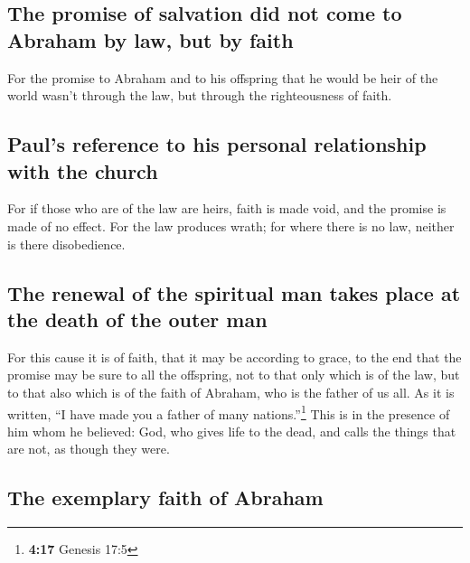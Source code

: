 \hypertarget{the-promise-of-salvation-did-not-come-to-abraham-by-law-but-by-faith}{%
\subsection{The promise of salvation did not come to Abraham by law, but
by
faith}\label{the-promise-of-salvation-did-not-come-to-abraham-by-law-but-by-faith}}

 For the promise to Abraham and to his offspring that he
would be heir of the world wasn't through the law, but through the
righteousness of faith.

\hypertarget{pauls-reference-to-his-personal-relationship-with-the-church}{%
\subsection{Paul's reference to his personal relationship with the
church}\label{pauls-reference-to-his-personal-relationship-with-the-church}}

 For if those who are of the law are heirs, faith is made
void, and the promise is made of no effect.  For the law
produces wrath; for where there is no law, neither is there
disobedience.

\hypertarget{the-renewal-of-the-spiritual-man-takes-place-at-the-death-of-the-outer-man}{%
\subsection{The renewal of the spiritual man takes place at the death of
the outer
man}\label{the-renewal-of-the-spiritual-man-takes-place-at-the-death-of-the-outer-man}}

 For this cause it is of faith, that it may be according
to grace, to the end that the promise may be sure to all the offspring,
not to that only which is of the law, but to that also which is of the
faith of Abraham, who is the father of us all.  As it is
written, ``I have made you a father of many nations.''\footnote{\textbf{4:17}
  Genesis 17:5} This is in the presence of him whom he believed: God,
who gives life to the dead, and calls the things that are not, as though
they were.

\hypertarget{the-exemplary-faith-of-abraham}{%
\subsection{The exemplary faith of
Abraham}\label{the-exemplary-faith-of-abraham}}

